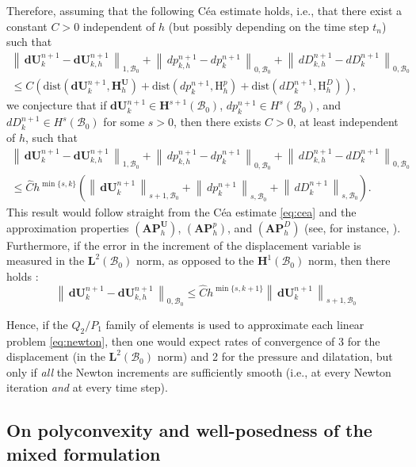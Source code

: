 \documentclass{sfuthesis}
\numberwithin{equation}{section}
\numberwithin{figure}{chapter}
\numberwithin{table}{chapter}
\theoremstyle{definition}
\def\*#1{{\mathbf{#1}}} %
\newcommand{\B}{\mathcal{B}}
\newcommand{\Hhu}{\mathbf{H}_h^{\*U}}
\newcommand{\Hhp}{\mathrm{H}_h^{p}}
\newcommand{\HhD}{\mathrm{H}_h^{D}}
\newcommand{\norm}[1]{{\left\| \, #1 \, \right\|}}
\begin{document}
Therefore, assuming that the following C\'{e}a estimate holds, i.e., that there exist a constant $C>0$ independent of $h$ (but possibly depending on the time step $t_n$) such that
\begin{multline} \label{eq:cea}
    \norm{\*d\*U_{k}^{n+1} - \*d\*U_{k,h}^{n+1}}_{1,\B_0} + \norm{dp_{k,h}^{n+1} - dp_k^{n+1}}_{0,\B_0} + \norm{dD_{k,h}^{n+1} - dD_k^{n+1}}_{0,\B_0} \\
    \leq C \left( \mathrm{dist}(\*d\*U_k^{n+1},\Hhu) + \mathrm{dist}(dp_k^{n+1},\Hhp) +  \mathrm{dist}(dD_k^{n+1},\HhD)\right),
\end{multline}
we conjecture that if $\*d\*U_k^{n+1} \in \*H^{s+1}(\B_0)$, $dp_k^{n+1} \in H^s(\B_0)$, and $dD_k^{n+1} \in H^s(\B_0)$ for some $s>0$, then there exists $\widehat{C}>0$, at least independent of $h$, such that
\begin{multline} \label{eq:a_priori_linear_problem}
    \norm{\*d\*U_{k}^{n+1} - \*d\*U_{k,h}^{n+1}}_{1,\B_0} + \norm{dp_{k,h}^{n+1} - dp_k^{n+1}}_{0,\B_0} + \norm{dD_{k,h}^{n+1} - dD_k^{n+1}}_{0,\B_0} \\
    \leq \widehat{C} h^{\min\{s,k\}} \left( \norm{\*d\*U_k^{n+1}}_{s+1,\B_0} + \norm{dp_k^{n+1}}_{s,\B_0} + \norm{dD_k^{n+1}}_{s,\B_0} \right).
\end{multline}
This result would follow straight from the C\'{e}a estimate \eqref{eq:cea} and the approximation properties $(\mathbf{AP}_h^\*U)$, $(\mathbf{AP}_h^p)$, and $(\mathbf{AP}_h^D)$ (see, for instance, \cite{AlmonacidGatica2018}). Furthermore, if the error in the increment of the displacement variable is measured in the $\*L^2(\B_0)$ norm, as opposed to the $\*H^1(\B_0)$ norm, then there holds \cite{BoffiBrezziFortin2013}:
\begin{equation}
    \norm{\*d\*U_{k}^{n+1} - \*d\*U_{k,h}^{n+1}}_{0,\B_0} \leq \widehat{C}  h^{\min\{s,k+1\}}  \norm{\*d\*U_k^{n+1}}_{s+1,\B_0}
\end{equation}

Hence, if the $Q_2/P_1$ family of elements is used to approximate each linear problem \eqref{eq:newton}, then one would expect rates of convergence of 3 for the displacement (in the $\*L^2(\B_0)$ norm) and 2 for the pressure and dilatation, but only if \textit{all} the Newton increments are sufficiently smooth (i.e., at every Newton iteration \textit{and} at every time step).

\subsection{On polyconvexity and well-posedness of the mixed formulation} \label{sec:polyconvexity}
\end{document}
